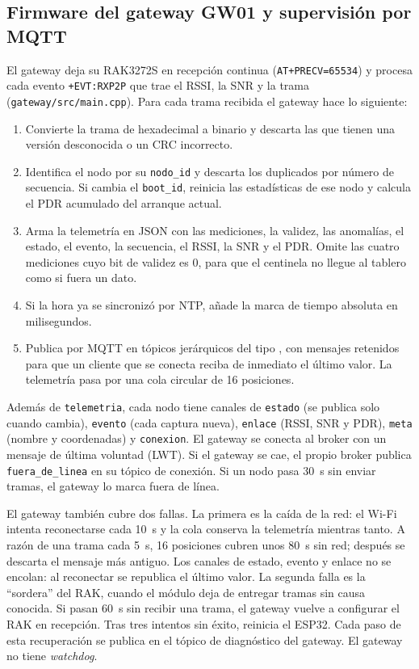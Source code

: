 \subsection{Firmware del gateway GW01 y supervisión por MQTT}
\label{sec:fw_gateway}

El gateway deja su RAK3272S en recepción continua (\texttt{AT+PRECV=65534}) y procesa cada evento \texttt{+EVT:RXP2P} que trae el RSSI, la SNR y la trama (\texttt{gateway/src/main.cpp}). Para cada trama recibida el gateway hace lo siguiente:
\begin{enumerate}
    \item Convierte la trama de hexadecimal a binario y descarta las que tienen una versión desconocida o un CRC incorrecto.
    \item Identifica el nodo por su \texttt{nodo\_id} y descarta los duplicados por número de secuencia. Si cambia el \texttt{boot\_id}, reinicia las estadísticas de ese nodo y calcula el PDR acumulado del arranque actual.
    \item Arma la telemetría en JSON con las mediciones, la validez, las anomalías, el estado, el evento, la secuencia, el RSSI, la SNR y el PDR. Omite las cuatro mediciones cuyo bit de validez es 0, para que el centinela no llegue al tablero como si fuera un dato.
    \item Si la hora ya se sincronizó por NTP, añade la marca de tiempo absoluta en milisegundos.
    \item Publica por MQTT en tópicos jerárquicos del tipo , con mensajes retenidos para que un cliente que se conecta reciba de inmediato el último valor. La telemetría pasa por una cola circular de 16 posiciones.
\end{enumerate}

Además de \texttt{telemetria}, cada nodo tiene canales de \texttt{estado} (se publica solo cuando cambia), \texttt{evento} (cada captura nueva), \texttt{enlace} (RSSI, SNR y PDR), \texttt{meta} (nombre y coordenadas) y \texttt{conexion}. El gateway se conecta al broker con un mensaje de última voluntad (LWT). Si el gateway se cae, el propio broker publica \texttt{fuera\_de\_linea} en su tópico de conexión. Si un nodo pasa 30~s sin enviar tramas, el gateway lo marca fuera de línea.

El gateway también cubre dos fallas. La primera es la caída de la red: el Wi-Fi intenta reconectarse cada 10~s y la cola conserva la telemetría mientras tanto. A razón de una trama cada 5~s, 16 posiciones cubren unos 80~s sin red; después se descarta el mensaje más antiguo. Los canales de estado, evento y enlace no se encolan: al reconectar se republica el último valor. La segunda falla es la ``sordera'' del RAK, cuando el módulo deja de entregar tramas sin causa conocida. Si pasan 60~s sin recibir una trama, el gateway vuelve a configurar el RAK en recepción. Tras tres intentos sin éxito, reinicia el ESP32. Cada paso de esta recuperación se publica en el tópico de diagnóstico del gateway. El gateway no tiene \textit{watchdog}.

